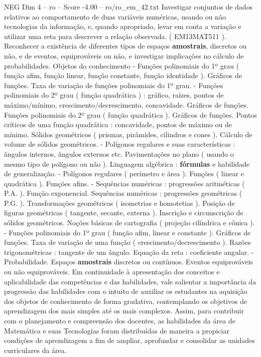 \begin{textsample}{NEG Dim 4 – ro – Score -4.00 – ro/ro\_em\_42.txt}
Investigar conjuntos de dados relativos ao comportamento de duas variáveis numéricas, usando ou não tecnologias da informação, e, quando apropriado, levar em conta a variação e utilizar uma reta para descrever a relação observada. ( EM13MAT511 ).
Reconhecer a existência de diferentes tipos de espaços \textbf{amostrais}, discretos ou não, e de eventos, equiprováveis ou não, e investigar implicações no cálculo de probabilidades.
Objetos do conhecimento - Funções polinomiais do 1º grau ( função afim, função linear, função constante, função identidade ).
Gráficos de funções.
Taxa de variação de funções polinomiais do 1º grau. - Funções polinomiais do 2º grau ( função quadrática ) : gráfico, raízes, pontos de máximo/mínimo, crescimento/decrescimento, concavidade.
Gráficos de funções.
Funções polinomiais do 2º grau ( função quadrática ).
Gráficos de funções.
Pontos críticos de uma função quadrática : concavidade, pontos de máximo ou de mínimo.
Sólidos geométricos ( prismas, pirâmides, cilindros e cones ).
Cálculo de volume de sólidos geométricos. - Polígonos regulares e suas características : ângulos internos, ângulos externos etc.
Pavimentações no plano ( usando o mesmo tipo de polígono ou não ).
Linguagem algébrica : \textbf{fórmulas} e habilidade de generalização. - Polígonos regulares ( perímetro e área ).
Funções ( linear e quadrática ).
Funções afins. - Sequências numéricas : progressões aritméticas ( P.A. ).
Função exponencial.
Sequências numéricas : progressões geométricas ( P.G. ).
Transformações geométricas ( isometrias e homotetias ).
Posição de figuras geométricas ( tangente, secante, externa ).
Inscrição e circunscrição de sólidos geométricos.
Noções básicas de cartografia ( projeção cilíndrica e cônica ). - Funções polinomiais do 1º grau ( função afim, linear e constante ).
Gráficos de funções.
Taxa de variação de uma função ( crescimento/decrescimento ).
Razões trigonométricas : tangente de um ângulo.
Equação da reta : coeficiente angular. - Probabilidade.
Espaços \textbf{amostrais} discretos ou contínuos.
Eventos equiprováveis ou não equiprováveis.
Em continuidade à apresentação dos conceitos e aplicabilidade das competências e das habilidades, vale salientar a importância da progressão das habilidades com o intuito de auxiliar os estudantes na aquisição dos objetos de conhecimento de forma gradativa, contemplando os objetivos de aprendizagem dos mais simples até os mais complexos.
Assim, para contribuir com o planejamento e compreensão dos docentes, as habilidades da área de Matemática e suas Tecnologias foram distribuídas de maneira a propiciar condições de aprendizagem a fim de ampliar, aprofundar e consolidar as unidades curriculares da área.

\end{textsample}
